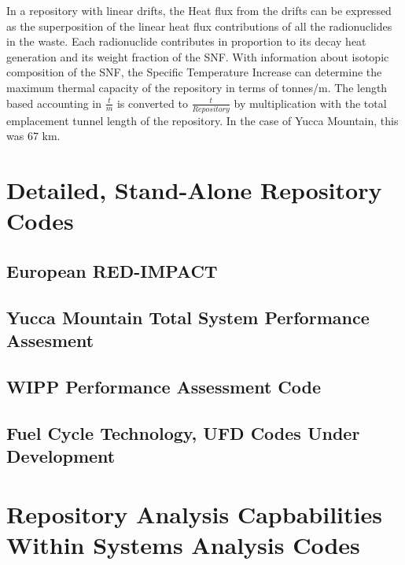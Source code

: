 In a repository with linear drifts, the Heat flux from the drifts can be expressed as the superposition of the linear heat flux 
contributions of all the radionuclides in the waste. Each radionuclide contributes in proportion to 
its decay heat generation and its weight fraction of the SNF. With information about isotopic 
composition of the SNF, the Specific Temperature Increase can determine the maximum thermal capacity 
of the repository in terms of tonnes/m. The length based accounting in $\frac{t}{m}$ is converted to 
$\frac{t}{Repository}$ by multiplication with the total emplacement tunnel length of the repository. 
In the case of Yucca Mountain, this was 67 km.



\section{Detailed, Stand-Alone Repository Codes}\label{sec:detailed_codes}

\subsection{European RED-IMPACT}

\subsection{Yucca Mountain Total System Performance Assesment}

\subsection{WIPP Performance Assessment Code}

\subsection{Fuel Cycle Technology, UFD Codes Under Development}


\section{Repository Analysis Capbabilities Within Systems Analysis Codes}\label{sec:SA_repos}

